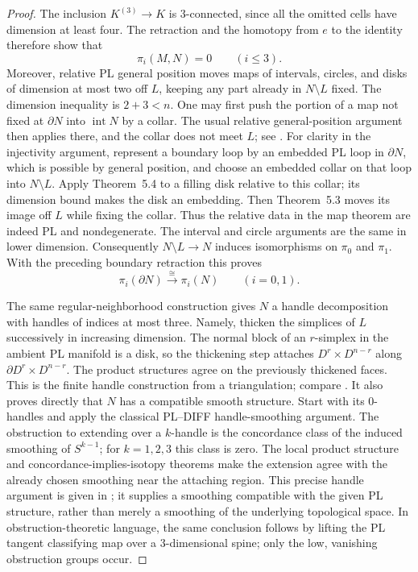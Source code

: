 \begin{proof}
The inclusion $K^{(3)}\longrightarrow K$ is $3$-connected, since
all the omitted cells have dimension at least four. The retraction
and the homotopy from $e$ to the identity therefore show that
\[
                 \pi_i(M,N)=0\qquad (i\leq3).
                                                        \tag{A.121.1}
\]
Moreover, relative PL general position moves maps of intervals,
circles, and disks of dimension at most two off $L$, keeping any
part already in $N\setminus L$ fixed. The dimension inequality is
$2+3<n$. One may first push the portion of a map not fixed at
$\partial N$ into $\operatorname{int}N$ by a collar. The usual
relative general-position argument then applies there, and the
collar does not meet $L$; see \cite[Chapter~5, Theorems~5.3--5.4]
{RourkeSanderson1972}. For clarity in the injectivity argument,
represent a boundary loop by an embedded PL loop in $\partial N$,
which is possible by general position, and choose an embedded collar
on that loop into $N\setminus L$. Apply Theorem~5.4 to a filling
disk relative to this collar; its dimension bound makes the disk an
embedding. Then Theorem~5.3 moves its image off $L$ while fixing the
collar. Thus the relative data in the map theorem are indeed PL and
nondegenerate. The interval and circle arguments are the same in
lower dimension. Consequently
$N\setminus L\longrightarrow N$ induces isomorphisms on
$\pi_0$ and $\pi_1$. With the preceding boundary retraction this
proves
\[
       \pi_i(\partial N)\xrightarrow{\ \cong\ }\pi_i(N)
                      \qquad (i=0,1).                  \tag{A.121.2}
\]

The same regular-neighborhood construction gives $N$ a handle
decomposition with handles of indices at most three. Namely, thicken
the simplices of $L$ successively in increasing dimension. The
normal block of an $r$-simplex in the ambient PL manifold is a disk,
so the thickening step attaches $D^r\times D^{n-r}$ along
$\partial D^r\times D^{n-r}$. The product structures agree on
the previously thickened faces. This is the finite handle
construction from a triangulation; compare
\cite[Proposition~6.9 and its proof, pp.~82--83]
{RourkeSanderson1972}.
It also proves directly that $N$ has a compatible smooth structure.
Start with its $0$-handles and apply the classical PL--DIFF
handle-smoothing argument. The obstruction to extending over a
$k$-handle is the concordance class of the induced smoothing of
$S^{k-1}$; for $k=1,2,3$ this class is zero. The local product
structure and concordance-implies-isotopy theorems make the extension
agree with the already chosen smoothing near the attaching region.
This precise handle argument is given in
\cite[Essay~IV, Appendix~B, p.~211]{KirbySiebenmann1977}; it supplies
a smoothing compatible with the given PL structure, rather than
merely a smoothing of the underlying topological space. In
obstruction-theoretic language, the same conclusion follows by
lifting the PL tangent classifying map over a $3$-dimensional spine;
only the low, vanishing obstruction groups occur.


\end{proof}
